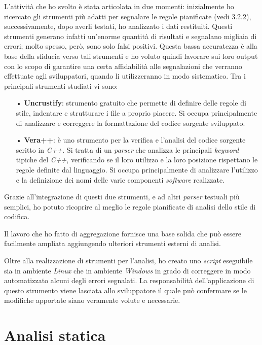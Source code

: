 L'attività che ho svolto è stata articolata in due momenti: inizialmente ho ricercato gli strumenti più adatti per segnalare le regole pianificate (vedi 3.2.2), successivamente, dopo averli testati, ho analizzato i dati restituiti. Questi strumenti generano infatti un'enorme quantità di risultati e segnalano migliaia di errori; molto spesso, però, sono solo falsi positivi. Questa bassa accuratezza è alla base della sfiducia verso tali strumenti e ho voluto quindi lavorare sui loro output con lo scopo di garantire una certa affidabilità alle segnalazioni che verranno effettuate agli sviluppatori, quando li utilizzeranno in modo sistematico. Tra i principali strumenti studiati vi sono:
\begin{itemize}
\item[•] \textbf{Uncrustify}: strumento gratuito che permette di definire delle regole di stile, indentare e strutturare i file a proprio piacere. Si occupa principalmente di analizzare e correggere la formattazione del codice sorgente sviluppato.

\item[•] \textbf{Vera++}: è uno strumento per la verifica e l'analisi del codice sorgente scritto in \textit{C++}. Si tratta di un \textit{parser} che analizza le principali \textit{keyword} tipiche del \textit{C++}, verificando se il loro utilizzo e la loro posizione rispettano le regole definite dal linguaggio. Si occupa principalmente di analizzare l'utilizzo e la definizione dei nomi delle varie componenti \textit{software} realizzate.
\end{itemize}

Grazie all'integrazione di questi due strumenti, e ad altri \textit{parser} testuali più semplici, ho potuto ricoprire al meglio le regole pianificate di analisi dello stile di codifica.

Il lavoro che ho fatto di aggregazione fornisce una base solida che può essere facilmente ampliata aggiungendo ulteriori strumenti esterni di analisi.

Oltre alla realizzazione di strumenti per l'analisi, ho creato uno \textit{script} eseguibile sia in ambiente \textit{Linux} che in ambiente \textit{Windows} in grado di correggere in modo automatizzato alcuni degli errori segnalati. La responsabilità dell'applicazione di questo strumento viene lasciata allo sviluppatore il quale può confermare se le modifiche apportate siano veramente volute e necessarie.

\section{Analisi statica}

